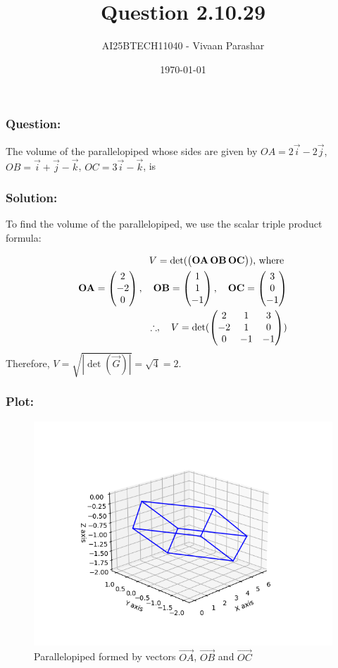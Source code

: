 \documentclass{beamer}
\title{Question 2.10.29}
\author{AI25BTECH11040 - Vivaan Parashar}
\date{\today}
\begin{document}
\frame{\titlepage}

\begin{frame}
    \frametitle{Question: }
    The volume of the parallelopiped whose sides are given by $\textit{OA} = 2\vec{i}-2\vec{j}$, $\textit{OB} = \vec{i}+\vec{j}-\vec{k}$, $\textit{OC} = 3\vec{i} - \vec{k}$, is
\end{frame}

\begin{frame}
    \frametitle{Solution: }
    To find the volume of the parallelopiped, we use the scalar triple product formula:

    \begin{align}
        V = \det(\begin{pmatrix}\mathbf{OA}\, \mathbf{OB}\, \mathbf{OC}\end{pmatrix})\text{, where } \\
        \mathbf{OA} = \begin{pmatrix}2                                             \\ -2 \\ 0\end{pmatrix}, \quad
        \mathbf{OB} = \begin{pmatrix}1                                             \\ 1 \\ -1\end{pmatrix}, \quad
        \mathbf{OC} = \begin{pmatrix}3                                             \\ 0 \\ -1\end{pmatrix}\\
        \therefore, \quad V = \det(\begin{pmatrix}2 & 1 & 3                     \\ -2 & 1 & 0 \\ 0 & -1 & -1\end{pmatrix})
    \end{align}
    Therefore, $V = \sqrt{|\det(\vec{G})|} = \sqrt{4} = 2$.
\end{frame}

\begin{frame}
    \frametitle{Plot: }
    \begin{figure}[h!]
        \centering
        \includegraphics[width=0.8\columnwidth]{../figs/plot.png}
        \caption{Parallelopiped formed by vectors $\vec{OA}$, $\vec{OB}$ and $\vec{OC}$}
        \label{fig:2.10.29}
    \end{figure}
\end{frame}
\end{document}
